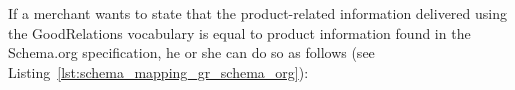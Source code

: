 If a merchant wants to state that the product-related information delivered using the GoodRelations vocabulary is equal to product information found in the Schema.org specification, he or she can do so as follows (see Listing~\ref{lst:schema_mapping_gr_schema_org}): \@



